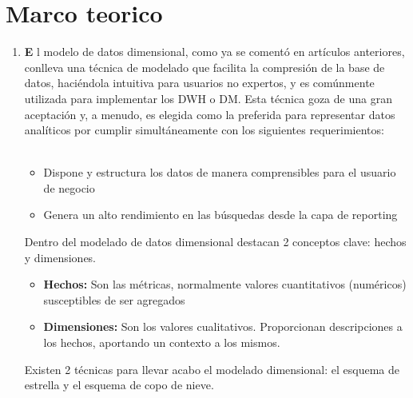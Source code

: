 \documentclass[twoside,twocolumn]{article}
\begin{document}


\section{Marco teorico}
\begin{enumerate}
\item \textbf{E} l modelo de datos dimensional, como ya se comentó en artículos anteriores, conlleva una técnica de modelado que facilita la compresión de la base de datos, haciéndola intuitiva para usuarios no expertos, y es comúnmente utilizada para implementar los DWH o DM.
Esta técnica goza de una gran aceptación y, a menudo, es elegida como la preferida para representar datos analíticos por cumplir simultáneamente con los siguientes requerimientos:\\ \\
\begin{itemize}
\item Dispone y estructura los datos de manera comprensibles para el usuario de negocio
\item Genera un alto rendimiento en las búsquedas desde la capa de reporting
\end{itemize}

Dentro del modelado de datos dimensional destacan 2 conceptos clave: hechos y dimensiones.

\begin{itemize}
\item\textbf{Hechos:} Son las métricas, normalmente valores cuantitativos (numéricos) susceptibles de ser agregados
\item \textbf{Dimensiones:} Son los valores cualitativos. Proporcionan descripciones a los hechos, aportando un contexto a los mismos.
\end{itemize}

Existen 2 técnicas para llevar acabo el modelado dimensional: el esquema de estrella y el esquema de copo de nieve.


\end{enumerate}
\end{document}
